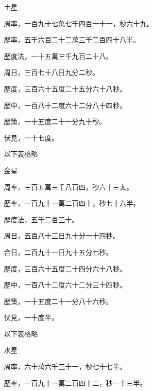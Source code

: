 \begin{pinyinscope}
 土星



 周率，一百九十七萬七千四百一十一，秒六十九。



 歷率，五千六百二十二萬三千二百四十八半。



 歷度法，一十五萬三千九百二十八。



 周日，三百七十八日九分二秒。



 歷度，三百六十五度二十五分六十八秒。



 歷中，一百八十二度六十二分八十四秒。



 歷策，一十五度二十一分九十秒。



 伏見，一十七度。



 以下表格略



 金星



 周率，三百五萬三千八百四，秒六十三太。



 歷率，一百九十一萬二百四十，秒七十六半。



 歷度法，五千二百三十。



 周日，五百八十三日九十分一十四秒。



 合日，二百九十一日九十五分七秒。



 歷度，三百六十五度二十四分六十八秒。



 歷中，一百八十二度六十二分三十四秒。



 歷策，一十五度二十一分八十六秒。



 伏見，一十度半。



 以下表格略



 水星



 周率，六十萬六千三十一，秒七十七半。



 歷率，一百九十一萬二百四十二，秒一十三半。




\end{pinyinscope}
